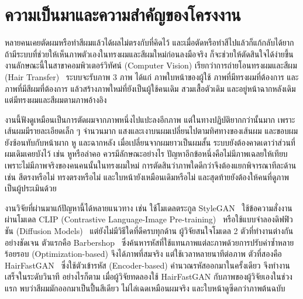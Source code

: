 
\section{ความเป็นมาและความสำคัญของโครงงาน}

หลายคนเคยตัดผมหรือทำสีผมแล้วได้ผลไม่ตรงกับที่คิดไว้ และเมื่อตัดหรือทำสีไปแล้วก็แก้กลับได้ยาก
ถ้ามีระบบที่ช่วยให้เห็นภาพตัวเองในทรงผมและสีผมใหม่ก่อนลงมือจริง ก็จะช่วยให้ตัดสินใจได้ง่ายขึ้น
งานลักษณะนี้ในสาขาคอมพิวเตอร์วิทัศน์ (Computer Vision) เรียกว่าการถ่ายโอนทรงผมและสีผม
(Hair Transfer)~\cite{Zhu_2021,nikolaev2024hairfastganrealisticrobusthair}
ระบบจะรับภาพ 3 ภาพ ได้แก่ ภาพใบหน้าของผู้ใช้ ภาพที่มีทรงผมที่ต้องการ และภาพที่มีสีผมที่ต้องการ
แล้วสร้างภาพใหม่ที่ยังเป็นผู้ใช้คนเดิม สวมเสื้อตัวเดิม และอยู่หน้าฉากหลังเดิม แต่มีทรงผมและสีผมตามภาพอ้างอิง

งานนี้ฟังดูเหมือนเป็นการตัดผมจากภาพหนึ่งไปแปะลงอีกภาพ แต่ในทางปฏิบัติยากกว่านั้นมาก
เพราะเส้นผมมีรายละเอียดเล็ก ๆ จำนวนมาก แสงและเงาบนผมเปลี่ยนไปตามทิศทางของเส้นผม
และขอบผมยังซ้อนทับกับหน้าผาก หู และฉากหลัง
เมื่อเปลี่ยนจากผมยาวเป็นผมสั้น ระบบยังต้องคาดเดาว่าส่วนที่ผมเดิมเคยบังไว้ เช่น หูหรือลำคอ ควรมีลักษณะอย่างไร
ปัญหาอีกข้อหนึ่งคือไม่มีภาพเฉลยให้เทียบ เพราะไม่มีภาพจริงของคนคนนั้นในทรงผมใหม่
การตัดสินว่าภาพใดดีกว่าจึงต้องแยกพิจารณาทีละด้าน เช่น สีตรงหรือไม่ ทรงตรงหรือไม่ และใบหน้ายังเหมือนเดิมหรือไม่
และสุดท้ายยังต้องให้คนที่ดูภาพเป็นผู้ประเมินด้วย

งานวิจัยที่ผ่านมาแก้ปัญหานี้ได้หลายแนวทาง เช่น ใช้โมเดลตระกูล StyleGAN~\cite{karras2020analyzingimprovingimagequality}
ใช้ข้อความสั่งงานผ่านโมเดล CLIP (Contrastive Language-Image Pre-training)~\cite{wei2022hairclipdesignhairtext}
หรือใช้แบบจำลองดิฟฟิวชัน (Diffusion Models)~\cite{rombach2022highresolutionimagesynthesislatent}
แต่ยังไม่มีวิธีใดที่ดีครบทุกด้าน ผู้วิจัยสนใจโมเดล 2 ตัวที่ทำงานต่างกันอย่างชัดเจน
ตัวแรกคือ Barbershop~\cite{Zhu_2021} ซึ่งค้นหารหัสที่ใช้แทนภาพแต่ละภาพด้วยการปรับค่าซ้ำหลายร้อยรอบ
(Optimization-based) จึงได้ภาพที่สมจริง แต่ใช้เวลาหลายนาทีต่อภาพ
ตัวที่สองคือ HairFastGAN~\cite{nikolaev2024hairfastganrealisticrobusthair} ซึ่งใช้ตัวเข้ารหัส (Encoder-based)
คำนวณรหัสออกมาในครั้งเดียว จึงทำงานเสร็จในระดับวินาที
อย่างไรก็ตาม เมื่อผู้วิจัยทดลองใช้ HairFastGAN กับภาพของผู้วิจัยเองในช่วงแรก
พบว่าสีผมมักออกมาเป็นปื้นสีเดียว ไม่ไล่เฉดเหมือนผมจริง และใบหน้าดูซีดกว่าภาพต้นฉบับ

